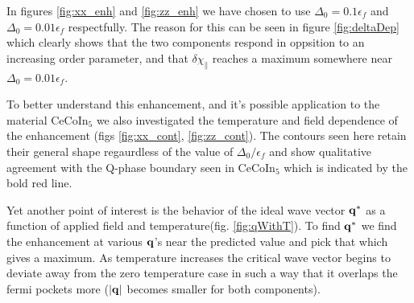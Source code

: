 \documentclass[prb,showpacs,amssymb,amsmath,twocolumn]{revtex4-1}
\begin{document}
In figures \ref{fig:xx_enh} and \ref{fig:zz_enh} we have chosen to use $\Delta_0 = 0.1\epsilon_f$ and $\Delta_0 = 0.01\epsilon_f$ respectfully. The reason for this can be seen in figure \ref{fig:deltaDep} which clearly shows that the two components respond in oppsition to an increasing order parameter, and that $\delta\chi_\parallel$ reaches a maximum somewhere near $\Delta_0 = 0.01\epsilon_f$.  

To better understand this enhancement, and it's possible application to the material CeCoIn$_5$ we also investigated the temperature and field dependence of the enhancement (figs \ref{fig:xx_cont}, \ref{fig:zz_cont}). The contours seen here retain their general shape regaurdless of the value of $\Delta_0/\epsilon_f$ and show qualitative agreement with the Q-phase boundary seen in CeCoIn$_5$ which is indicated by the bold red line.

Yet another point of interest is  the behavior of the ideal wave vector ${\bf q}^*$ as a function of applied field and temperature(fig. \ref{fig:qWithT}). To find ${\bf q}^*$ we find the enhancement at various ${\bf q}$'s near the predicted value and pick that which gives a maximum. As
temperature increases the critical wave vector begins to deviate away from the
zero temperature case in such a way that it overlaps the fermi pockets more
($|\bf{q}|$ becomes smaller for both components). 

\end{document}

